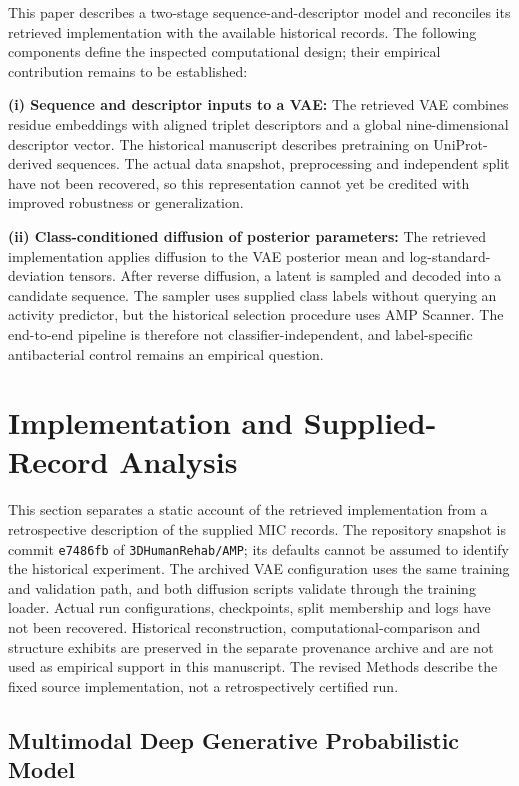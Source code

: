 \documentclass[journal]{IEEEtran}
\begin{document}
This paper describes a two-stage sequence-and-descriptor model and reconciles its retrieved implementation with the available historical records. The following components define the inspected computational design; their empirical contribution remains to be established:

\textbf{(i) Sequence and descriptor inputs to a VAE:} The retrieved VAE combines residue embeddings with aligned triplet descriptors and a global nine-dimensional descriptor vector. The historical manuscript describes pretraining on UniProt-derived sequences. The actual data snapshot, preprocessing and independent split have not been recovered, so this representation cannot yet be credited with improved robustness or generalization.

\textbf{(ii) Class-conditioned diffusion of posterior parameters:} The retrieved implementation applies diffusion to the VAE posterior mean and log-standard-deviation tensors. After reverse diffusion, a latent is sampled and decoded into a candidate sequence. The sampler uses supplied class labels without querying an activity predictor, but the historical selection procedure uses AMP Scanner. The end-to-end pipeline is therefore not classifier-independent, and label-specific antibacterial control remains an empirical question.

\section{Implementation and Supplied-Record Analysis}
\label{sec:evidence_scope}
This section separates a static account of the retrieved implementation from a retrospective description of the supplied MIC records. The repository snapshot is commit \texttt{e7486fb} of \texttt{3DHumanRehab/AMP}; its defaults cannot be assumed to identify the historical experiment. The archived VAE configuration uses the same training and validation path, and both diffusion scripts validate through the training loader. Actual run configurations, checkpoints, split membership and logs have not been recovered. Historical reconstruction, computational-comparison and structure exhibits are preserved in the separate provenance archive and are not used as empirical support in this manuscript. The revised Methods describe the fixed source implementation, not a retrospectively certified run.

\subsection{Multimodal Deep Generative Probabilistic Model}
\end{document}
